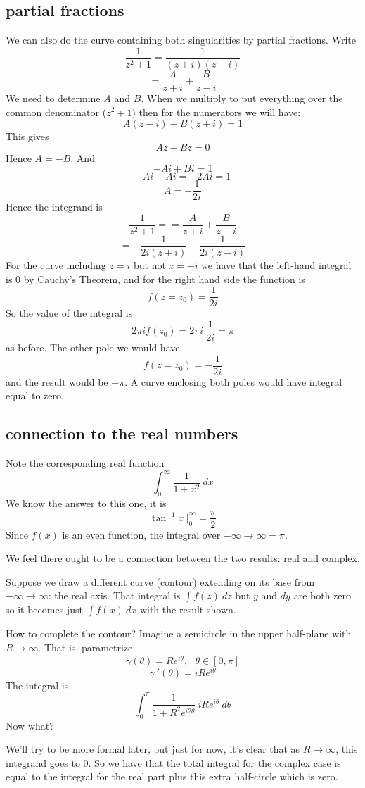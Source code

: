 \documentclass[11pt, oneside]{article}   	%
\begin{document}
\subsection*{partial fractions}
We can also do the curve containing both singularities by partial fractions.  Write
\[ \frac{1}{z^2 + 1} = \frac{1}{(z+i)(z-i)} \]
\[ = \frac{A}{z+i} + \frac{B}{z-i} \]
We need to determine $A$ and $B$.  When we multiply to put everything over the common denominator ($z^2 + 1)$ then for the numerators we will have:
\[ A(z-i) + B(z+i) = 1 \]
This gives
\[ Az + Bz = 0 \]
Hence $A = -B$.  And
\[ -Ai + Bi = 1 \]
\[ -Ai - Ai = -2Ai = 1 \]
\[ A = -\frac{1}{2i} \]
Hence the integrand is
\[ \frac{1}{z^2 + 1} = = \frac{A}{z+i} + \frac{B}{z-i} \]
\[ = -\frac{1}{2i(z+i)} + \frac{1}{2i(z-i)} \] 
For the curve including $z = i$ but not $z = -i$ we have that the left-hand integral is 0 by Cauchy's Theorem, and for the right hand side the function is
\[ f(z = z_0) = \frac{1}{2i} \]
So the value of the integral is
\[ 2 \pi i f(z_0) = 2 \pi i \ \frac{1}{2i} = \pi \]
as before.  The other pole we would have
\[ f(z = z_0) = -\frac{1}{2i} \]
and the result would be $- \pi$.  A curve enclosing both poles would have integral equal to zero.

\subsection*{connection to the real numbers}
Note the corresponding real function
\[ \int_0^{\infty} \frac{1}{1 + x^2} \ dx \]
We know the answer to this one, it is 
\[ \tan^{-1} x \ \bigg |_0^{\infty} = \frac{\pi}{2}  \]
Since $f(x)$ is an even function, the integral over $-\infty \rightarrow \infty = \pi$.

We feel there ought to be a connection between the two results:  real and complex.

Suppose we draw a different curve (contour) extending on its base from $-\infty \rightarrow \infty$: the real axis.  That integral is $\int f(z) \ dz$ but $y$ and $dy$ are both zero so it becomes just $\int f(x) \ dx$ with the result shown.

How to complete the contour?  Imagine a semicircle in the upper half-plane with $R \rightarrow \infty$.  That is, parametrize
\[ \gamma(\theta) = Re^{i\theta}, \ \ \ \theta \in [0, \pi] \]
\[ \gamma \ '(\theta) =  iRe^{i\theta} \]
The integral is
\[ \int_0^{\pi} \frac{1}{1 + R^2 e^{i2\theta}} \ i R e^{i \theta} \ d \theta \]
Now what?

We'll try to be more formal later, but just for now, it's clear that as $R \rightarrow \infty$, this integrand goes to 0.  So we have that the total integral for the complex case is equal to the integral for the real part plus this extra half-circle which is zero.
\end{document}
